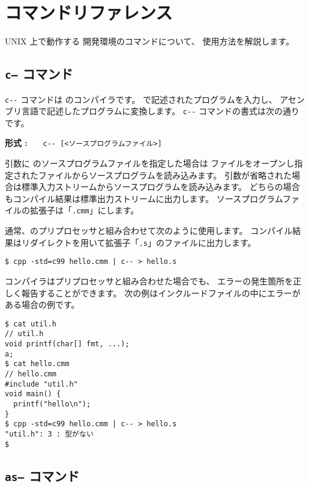 % 
%
\chapter{コマンドリファレンス}

UNIX 上で動作する \tac 開発環境のコマンドについて、
使用方法を解説します。

\section{{\tt c--} コマンド}

\verb/c--/ コマンドは \cmml のコンパイラです。
\cmml で記述されたプログラムを入力し、
\tac アセンブリ言語で記述したプログラムに変換します。
\verb/c--/ コマンドの書式は次の通りです。

\begin{flushleft}
{\bf 形式 : }~~~\verb/c-- [<ソースプログラムファイル>]/
\end{flushleft}

引数に \cmml のソースプログラムファイルを指定した場合は
ファイルをオープンし指定されたファイルからソースプログラムを読み込みます。
引数が省略された場合は標準入力ストリームからソースプログラムを読み込みます。
どちらの場合もコンパイル結果は標準出力ストリームに出力します。
ソースプログラムファイルの拡張子は「\verb/.cmm/」にします。

通常、\cl のプリプロセッサと組み合わせて次のように使用します。
コンパイル結果はリダイレクトを用いて拡張子「\verb/.s/」のファイルに出力します。

\begin{mylist}
\begin{verbatim}
$ cpp -std=c99 hello.cmm | c-- > hello.s
\end{verbatim}
\end{mylist}

\cmm コンパイラはプリプロセッサと組み合わせた場合でも、
エラーの発生箇所を正しく報告することができます。
次の例はインクルードファイルの中にエラーがある場合の例です。

\begin{mylist}
\begin{verbatim}
$ cat util.h 
// util.h
void printf(char[] fmt, ...);
a;
$ cat hello.cmm
// hello.cmm
#include "util.h"
void main() {
  printf("hello\n");
}
$ cpp -std=c99 hello.cmm | c-- > hello.s
"util.h": 3 : 型がない
$ 
\end{verbatim}
\end{mylist}

\section{{\tt as--} コマンド}

